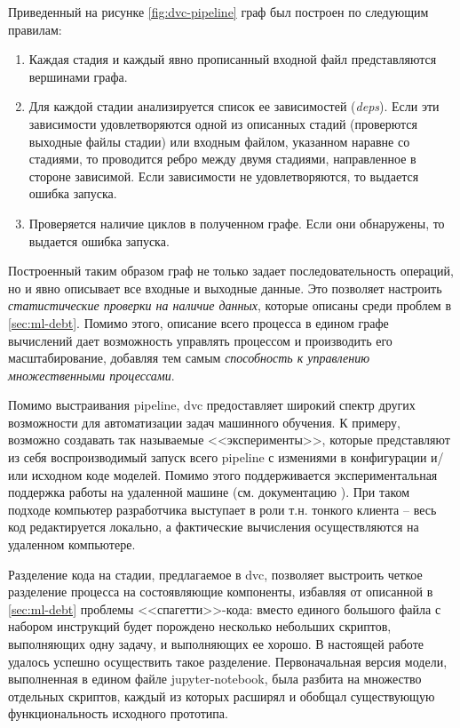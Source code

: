 Приведенный на рисунке \ref{fig:dvc-pipeline} граф был построен по следующим правилам:
\begin{enumerate}
    \item Каждая стадия и каждый явно прописанный входной файл представляются вершинами графа.
    \item Для каждой стадии анализируется список ее зависимостей (\textit{deps}).
        Если эти зависимости удовлетворяются одной из описанных стадий (проверются выходные файлы стадии) или входным файлом, указанном наравне со стадиями, то проводится ребро между двумя стадиями, направленное в стороне зависимой.
        Если зависимости не удовлетворяются, то выдается ошибка запуска.
    \item Проверяется наличие циклов в полученном графе.
        Если они обнаружены, то выдается ошибка запуска.
\end{enumerate}
Построенный таким образом граф не только задает последовательность операций, но и явно описывает все входные и выходные данные.
Это позволяет настроить \textit{статистические проверки на наличие данных}, которые описаны среди проблем в \ref{sec:ml-debt}.
Помимо этого, описание всего процесса в едином графе вычислений дает возможность управлять процессом и производить его масштабирование, добавляя тем самым \textit{способность к управлению множественными процессами}.

Помимо выстраивания \gls{pipeline}, \gls{dvc} предоставляет широкий спектр других возможности для автоматизации задач машинного обучения.
К примеру, возможно создавать так называемые <<эксперименты>>, которые представляют из себя воспроизводимый запуск всего \gls{pipeline} с измениями в конфигурации и/или исходном коде моделей.
Помимо этого поддерживается экспериментальная поддержка работы на удаленной машине (см. документацию \cite{cite:dvc}).
При таком подходе компьютер разработчика выступает в роли т.н. тонкого клиента -- весь код редактируется локально, а фактические вычисления осуществляются на удаленном компьютере.

Разделение кода на стадии, предлагаемое в \gls{dvc}, позволяет выстроить четкое разделение процесса на состоявляющие компоненты, избавляя от описанной в \ref{sec:ml-debt} проблемы <<спагетти>>-кода: вместо единого большого файла с набором инструкций будет порождено несколько небольших скриптов, выполняющих одну задачу, и выполняющих ее хорошо.
В настоящей работе удалось успешно осуществить такое разделение.
Первоначальная версия модели, выполненная в едином файле \gls{jupyter-notebook}, была разбита на множество отдельных скриптов, каждый из которых расширял и обобщал существующую функциональность исходного прототипа.
